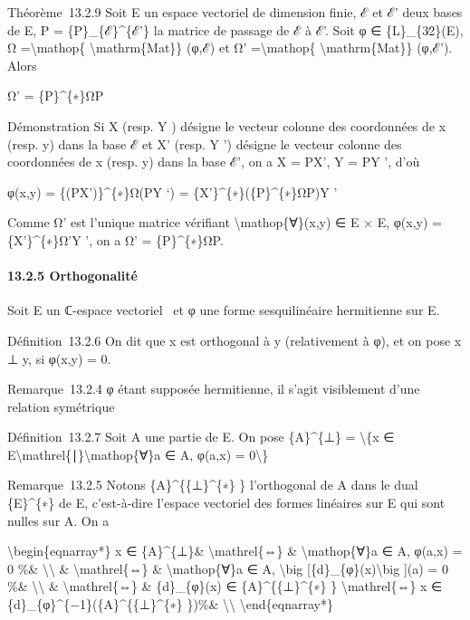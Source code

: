 \documentclass[]{article}
\begin{document}
Théorème~13.2.9 Soit E un espace vectoriel de dimension finie, ℰ et ℰ'
deux bases de E, P = \{P\}\_\{ℰ\}\^{}\{ℰ'\} la matrice de passage de ℰ à
ℰ'. Soit φ ∈ \{L\}\_\{3∕2\}(E), Ω =\textbackslash{}mathop\{
\textbackslash{}mathrm\{Mat\}\} (φ,ℰ) et Ω' =\textbackslash{}mathop\{
\textbackslash{}mathrm\{Mat\}\} (φ,ℰ'). Alors

Ω' = \{P\}\^{}\{∗\}ΩP

Démonstration Si X (resp. Y ) désigne le vecteur colonne des coordonnées
de x (resp. y) dans la base ℰ et X' (resp. Y ') désigne le vecteur
colonne des coordonnées de x (resp. y) dans la base ℰ', on a X = PX', Y
= PY ', d'où

φ(x,y) = \{(PX')\}\^{}\{∗\}Ω(PY `) = \{X'\}\^{}\{∗\}(\{P\}\^{}\{∗\}ΩP)Y
'

Comme Ω' est l'unique matrice vérifiant \textbackslash{}mathop\{∀\}(x,y)
∈ E × E, φ(x,y) = \{X'\}\^{}\{∗\}Ω'Y ', on a Ω' = \{P\}\^{}\{∗\}ΩP.

\paragraph{13.2.5 Orthogonalité}

Soit E un ℂ-espace vectoriel ~et φ une forme sesquilinéaire hermitienne
sur E.

Définition~13.2.6 On dit que x est orthogonal à y (relativement à φ), et
on pose x ⊥ y, si φ(x,y) = 0.

Remarque~13.2.4 φ étant supposée hermitienne, il s'agit visiblement
d'une relation symétrique

Définition~13.2.7 Soit A une partie de E. On pose \{A\}\^{}\{⊥\} =
\textbackslash{}\{x ∈
E\textbackslash{}mathrel\{∣\}\textbackslash{}mathop\{∀\}a ∈ A, φ(a,x) =
0\textbackslash{}\}

Remarque~13.2.5 Notons \{A\}\^{}\{\{⊥\}\^{}\{∗\} \} l'orthogonal de A
dans le dual \{E\}\^{}\{∗\} de E, c'est-à-dire l'espace vectoriel des
formes linéaires sur E qui sont nulles sur A. On a

\textbackslash{}begin\{eqnarray*\} x ∈ \{A\}\^{}\{⊥\}\&
\textbackslash{}mathrel\{⇔\} \& \textbackslash{}mathop\{∀\}a ∈ A, φ(a,x)
= 0 \%\& \textbackslash{}\textbackslash{} \&
\textbackslash{}mathrel\{⇔\} \& \textbackslash{}mathop\{∀\}a ∈ A,
\textbackslash{}big {[}\{d\}\_\{φ\}(x)\textbackslash{}big {]}(a) = 0
\%\& \textbackslash{}\textbackslash{} \& \textbackslash{}mathrel\{⇔\} \&
\{d\}\_\{φ\}(x) ∈ \{A\}\^{}\{\{⊥\}\^{}\{∗\} \}
\textbackslash{}mathrel\{⇔\} x ∈
\{d\}\_\{φ\}\^{}\{−1\}(\{A\}\^{}\{\{⊥\}\^{}\{∗\} \})\%\&
\textbackslash{}\textbackslash{} \textbackslash{}end\{eqnarray*\}
\end{document}
